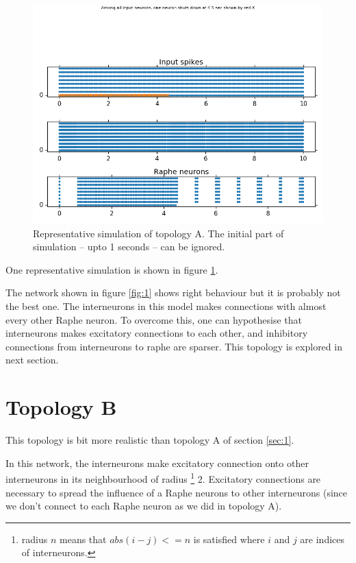 \documentclass[]{article}
\begin{document}
\begin{figure}[h!]
\begin{center}
    \includegraphics[width=1\textwidth]{./_snapshots/437f1834-d269-11e5-9456-e94c7dbd7a53.png}
\end{center}

\caption{Representative simulation of topology A. The initial part of simulation
    -- upto 1 seconds -- can be ignored. }
\label{fig:simulation}
\end{figure}

One representative simulation is shown in figure \ref{fig:simulation}.

The network shown in figure \ref{fig:1} shows right behaviour  but it is
probably not the best one. The interneurons in this model makes connections with
almost every other Raphe neuron. To overcome this, one can hypothesise that
interneurons makes excitatory connections to each other, and inhibitory
connections from interneurons to raphe are sparser. This topology is explored in
next section.

\section{Topology B}
\label{sec:2}

This topology is bit more realistic than topology A of section \ref{sec:1}.

In this network, the interneurons make excitatory connection onto other
interneurons in its neighbourhood of radius \footnote{radius $n$ means that
    $abs(i-j) <= n$ is satisfied where $i$ and $j$ are indices of interneurons.
} 2. Excitatory connections are necessary to spread the influence of a Raphe
neurons to other interneurons (since we don't connect to each Raphe neuron as we
did in topology A).
\end{document}
